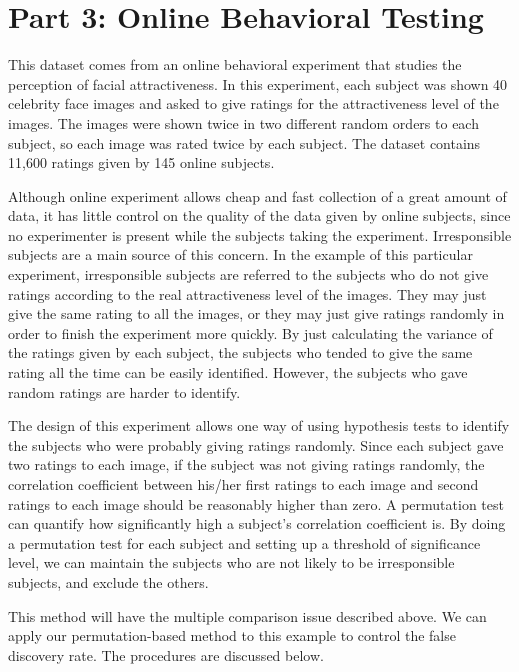 \documentclass[11pt,notitlepage]{article}
\begin{document}
\newpage

\section*{Part 3: Online Behavioral Testing}

This dataset comes from an online behavioral experiment that studies the perception of facial attractiveness. In this experiment, each subject was shown 40 celebrity face images and asked to give ratings for the attractiveness level of the images. The images were shown twice in two different random orders to each subject, so each image was rated twice by each subject. The dataset contains 11,600 ratings given by 145 online subjects.

Although online experiment allows cheap and fast collection of a great amount of data, it has little control on the quality of the data given by online subjects, since no experimenter is present while the subjects taking the experiment. Irresponsible subjects are a main source of this concern. In the example of this particular experiment, irresponsible subjects are referred to the subjects who do not give ratings according to the real attractiveness level of the images. They may just give the same rating to all the images, or they may just give ratings randomly in order to finish the experiment more quickly. By just calculating the variance of the ratings given by each subject, the subjects who tended to give the same rating all the time can be easily identified. However, the subjects who gave random ratings are harder to identify.

The design of this experiment allows one way of using hypothesis tests to identify the subjects who were probably giving ratings randomly. Since each subject gave two ratings to each image, if the subject was not giving ratings randomly, the correlation coefficient between his/her first ratings to each image and second ratings to each image should be reasonably higher than zero. A permutation test can quantify how significantly high a subject's correlation coefficient is. By doing a permutation test for each subject and setting up a threshold of significance level, we can maintain the subjects who are not likely to be irresponsible subjects, and exclude the others.

This method will have the multiple comparison issue described above. We can apply our permutation-based method to this example to control the false discovery rate. The procedures are discussed below. 
\end{document}
